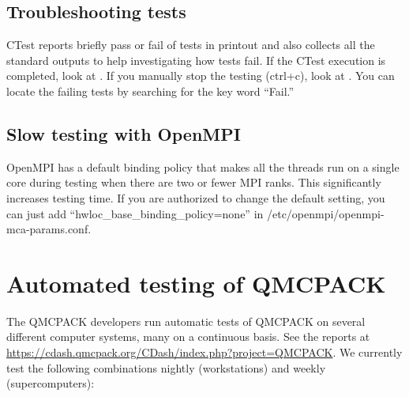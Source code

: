 \subsection{Troubleshooting tests}
CTest reports briefly pass or fail of tests in printout and also collects all the standard outputs to help investigating how tests fail.
If the CTest execution is completed, look at .
If you manually stop the testing (ctrl+c), look at .
You can locate the failing tests by searching for the key word ``Fail.''

\subsection{Slow testing with OpenMPI}
OpenMPI has a default binding policy that makes all the threads run on a single core during testing when there are two or fewer MPI ranks.
This significantly increases testing time. If you are authorized to change the default setting, you can just add ``hwloc\_base\_binding\_policy=none'' in /etc/openmpi/openmpi-mca-params.conf.

\section{Automated testing of QMCPACK}

The QMCPACK developers run automatic tests of QMCPACK on several
different computer systems,  many on a continuous basis. See the reports at
\url{https://cdash.qmcpack.org/CDash/index.php?project=QMCPACK}.
We currently test
the following combinations nightly (workstations) and weekly (supercomputers):

